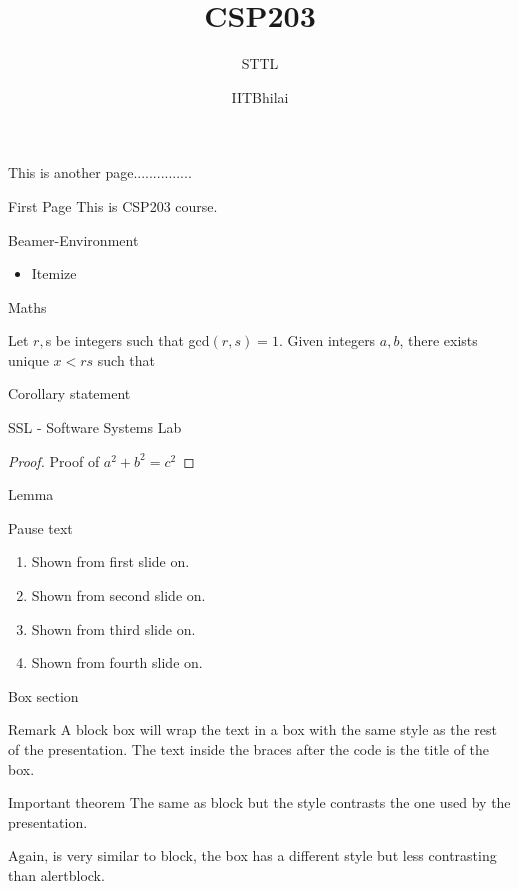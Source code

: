 \documentclass [pdf]{beamer}
\title[heading]{CSP203}
\subtitle{STTL}
\author[me]{IITBhilai}
\begin{document}
\begin{frame}
\titlepage
\end{frame}
\begin{frame}
	This is another page...............
\end{frame}
\begin{frame}[t]{First Page}
	This is CSP203 course.
\end{frame}
\begin{frame}[t]{Beamer-Environment}
	\begin{itemize}
		\item Itemize
	\end{itemize}
\end{frame}
\begin{frame}{Maths}
	\begin{theorem}
		Let $r, $s be integers such that gcd$(r, s)=1$.
		Given integers $a,b$, there exists unique $x <rs$
		such that
	\end{theorem}
	\begin{corollary}
		Corollary statement
	\end{corollary}
	\begin{definition}
		SSL - Software Systems Lab
	\end{definition}
	\begin{proof}
		Proof of $a^2 + b^2 = c^2$
	\end{proof}
	\begin{lemma}
		Lemma
	\end{lemma}
\end{frame}
\begin{frame}[t]{Pause text}
	\begin{enumerate}
		\item Shown from first slide on. \pause
		\item Shown from second slide on. \pause
		\item Shown from third slide on. \pause
		\item Shown from fourth slide on.
	\end{enumerate}
\end{frame}
\begin{frame}[t]{Box section}
	\begin{block}{Remark}
		A block box will wrap the text in a box with the same style as the rest of the presentation. The text
		inside the braces after the  code is the title of the box.
	\end{block}
\begin{alertblock}{Important theorem} 
	The same as block but the style contrasts the one used by the presentation.
\end{alertblock}
\begin{examples} 
	Again, is very similar to block, the box has a different style but less contrasting than alertblock.
\end{examples}
\end{frame}
\end{document}
